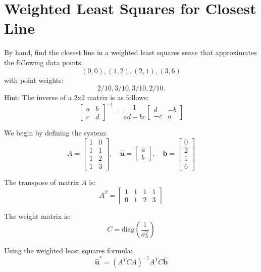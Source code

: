\documentclass[11pt]{article}
\begin{document}


\section{Weighted Least Squares for Closest Line}

By hand, find the closest line in a weighted least squares sense that approximates the following data points: 
\[
(0,0), (1,2), (2,1), (3,6)
\]
with point weights:
\[
2/10, 3/10, 3/10, 2/10.
\]
Hint: The inverse of a 2x2 matrix is as follows:
\[
\begin{bmatrix} 
a & b \\ 
c & d 
\end{bmatrix}^{-1} = \frac{1}{ad-bc} 
\begin{bmatrix} 
d & -b \\ 
-c & a 
\end{bmatrix}
\]

We begin by defining the system:
\[
A = 
\begin{bmatrix}
1 & 0 \\
1 & 1 \\
1 & 2 \\
1 & 3
\end{bmatrix}, \quad
\hat{\mathbf{u}} = 
\begin{bmatrix}
a \\
b
\end{bmatrix}, \quad
\hat{\mathbf{b}} = 
\begin{bmatrix}
0 \\
2 \\
1 \\
6
\end{bmatrix}
\]

The transpose of matrix $A$ is:
\[
A^T = 
\begin{bmatrix}
1 & 1 & 1 & 1 \\
0 & 1 & 2 & 3
\end{bmatrix}
\]

The weight matrix is:
\[
C = \text{diag}\left(\frac{1}{\sigma_n^2}\right)
\]

Using the weighted least squares formula:
\[
\hat{\mathbf{u}}^* = (A^T C A)^{-1} A^T C \hat{\mathbf{b}}
\]
\end{document}
